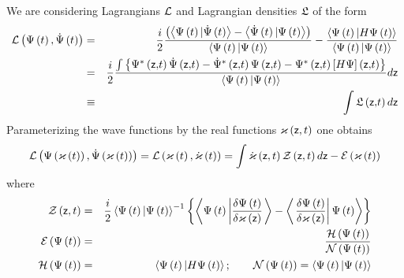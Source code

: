 We are considering Lagrangians ${\cal L}$ and Lagrangian densities ${\frak L}
$ of the form 
\begin{eqnarray}
{\cal L}\left( \Psi \left( t\right) ,\dot{\Psi}\left( t\right) \right) &=&%
\frac{i}{2}\frac{\left( \left\langle \Psi \left( t\right) |\dot{\Psi}\left(
t\right) \right\rangle -\left\langle \dot{\Psi}\left( t\right) |\Psi \left(
t\right) \right\rangle \right) }{\left\langle \Psi \left( t\right) |\Psi
\left( t\right) \right\rangle }-\frac{\left\langle \Psi \left( t\right)
|H\Psi \left( t\right) \right\rangle }{\left\langle \Psi \left( t\right)
|\Psi \left( t\right) \right\rangle }  \nonumber \\
&=&\frac{i}{2}\frac{\int \left\{ \Psi ^{\ast }\left( {\sf z,}t\right) \dot{%
\Psi}\left( {\sf z,}t\right) -\dot{\Psi}^{\ast }\left( {\sf z,}t\right) \Psi
\left( {\sf z,}t\right) -\Psi ^{\ast }\left( {\sf z,}t\right) \left[ H\Psi %
\right] \left( {\sf z,}t\right) \right\} }{\left\langle \Psi \left( t\right)
|\Psi \left( t\right) \right\rangle }d{\sf z}  \nonumber \\
&\equiv &\int {\frak L}\left( {\sf z,}t\right) d{\sf z}  \label{laden}
\end{eqnarray}%
Parameterizing the wave functions by the real functions ${\cal \varkappa }%
\left( {\sf z},t\right) $ one obtains 
\begin{equation}
{\cal L}\left( \Psi \left( {\cal \varkappa }\left( t\right) \right) ,\dot{%
\Psi}\left( {\cal \varkappa }\left( t\right) \right) \right) ={\cal L}\left( 
{\cal \varkappa }\left( t\right) ,{\cal \dot{\varkappa}}\left( t\right)
\right) =\int {\cal \dot{\varkappa}}\left( {\sf z},t\right) {\cal Z}\left( 
{\sf z},t\right) d{\sf z}-{\cal E}\left( {\cal \varkappa }\left( t\right)
\right)  \label{ladef}
\end{equation}%
where 
\begin{eqnarray}
{\cal Z}\left( {\sf z},t\right) &=&\frac{i}{2}\left\langle \Psi \left(
t\right) |\Psi \left( t\right) \right\rangle ^{-1}\left\{ \left\langle \Psi
\left( t\right) \left| \frac{\delta \Psi \left( t\right) }{\delta {\cal %
\varkappa }\left( {\sf z}\right) }\right. \right\rangle -\left\langle \left. 
\frac{\delta \Psi \left( t\right) }{\delta {\cal \varkappa }\left( {\sf z}%
\right) }\right| \Psi \left( t\right) \right\rangle \right\} \\
{\cal E}\left( \Psi \left( t\right) \right) &=&\frac{{\cal H}\left( \Psi
\left( t\right) \right) }{{\cal N}\left( \Psi \left( t\right) \right) } \\
{\cal H}\left( \Psi \left( t\right) \right) &=&\left\langle \Psi \left(
t\right) |H\Psi \left( t\right) \right\rangle ;\qquad {\cal N}\left( \Psi
\left( t\right) \right) =\left\langle \Psi \left( t\right) |\Psi \left(
t\right) \right\rangle
\end{eqnarray}

